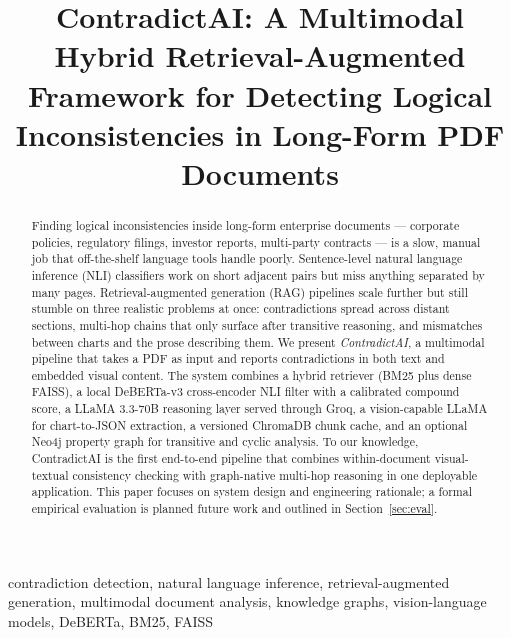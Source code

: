 \documentclass[conference]{IEEEtran}
\begin{document}
\title{ContradictAI: A Multimodal Hybrid Retrieval-Augmented Framework for Detecting Logical Inconsistencies in Long-Form PDF Documents}
\author{
}
\maketitle
\begin{abstract}
Finding logical inconsistencies inside long-form enterprise documents --- corporate policies, regulatory filings, investor reports, multi-party contracts --- is a slow, manual job that off-the-shelf language tools handle poorly. Sentence-level natural language inference (NLI) classifiers work on short adjacent pairs but miss anything separated by many pages. Retrieval-augmented generation (RAG) pipelines scale further but still stumble on three realistic problems at once: contradictions spread across distant sections, multi-hop chains that only surface after transitive reasoning, and mismatches between charts and the prose describing them. We present \emph{ContradictAI}, a multimodal pipeline that takes a PDF as input and reports contradictions in both text and embedded visual content. The system combines a hybrid retriever (BM25 plus dense FAISS), a local DeBERTa-v3 cross-encoder NLI filter with a calibrated compound score, a LLaMA 3.3-70B reasoning layer served through Groq, a vision-capable LLaMA for chart-to-JSON extraction, a versioned ChromaDB chunk cache, and an optional Neo4j property graph for transitive and cyclic analysis. To our knowledge, ContradictAI is the first end-to-end pipeline that combines within-document visual-textual consistency checking with graph-native multi-hop reasoning in one deployable application. This paper focuses on system design and engineering rationale; a formal empirical evaluation is planned future work and outlined in Section~\ref{sec:eval}.
\end{abstract}
\begin{IEEEkeywords}
contradiction detection, natural language inference, retrieval-augmented generation, multimodal document analysis, knowledge graphs, vision-language models, DeBERTa, BM25, FAISS
\end{IEEEkeywords}
\end{document}
